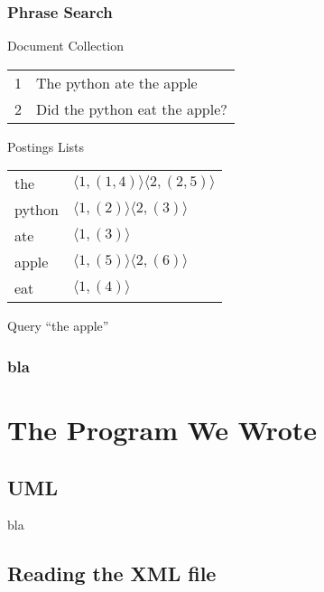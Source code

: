 \documentclass{beamer}
\begin{document}
\begin{frame}
  \frametitle{Phrase Search}

  \begin{block}{Document Collection}

    \begin{tabular}{ l | l }
      1 & The python ate the apple \\
      2 & Did the python eat the apple? \\
    \end{tabular}

  \end{block}

  \begin{block}{Postings Lists}
    \begin{tabular}{ l | l }
      the & $ \langle 1,(1,4) \rangle \langle 2,(2,5) \rangle $ \\
      python & $ \langle 1,(2) \rangle \langle 2,(3) \rangle $ \\
      ate & $ \langle 1,(3) \rangle $ \\
      apple & $ \langle 1,(5) \rangle \langle 2,(6) \rangle $ \\
      eat & $ \langle 1,(4) \rangle $ \\
    \end{tabular}
  \end{block}

  \begin{block}{Query}
    ``the apple''
  \end{block}

\end{frame}

\begin{frame}
  \frametitle{bla}
\end{frame}

\section{The Program We Wrote}

\subsection{UML}

\begin{frame}
bla
\end{frame}

\subsection{Reading the XML file}
\end{document}
